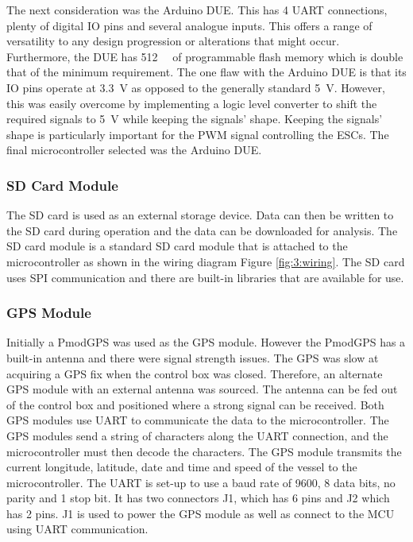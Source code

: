 		The next consideration was the Arduino DUE. This has 4 UART connections, plenty of digital IO pins and several analogue inputs. This offers a range of versatility to any design progression or alterations that might occur. Furthermore, the DUE has \SI{512}{\kilo\byte} of programmable flash memory which is double that of the minimum requirement. The one flaw with the Arduino DUE is that its IO pins operate at \SI{3.3}{\volt} as opposed to the generally standard \SI{5}{\volt}. However, this was easily overcome by implementing a logic level converter to shift the required signals to \SI{5}{\volt} while keeping the signals' shape. Keeping the signals' shape is particularly important for the PWM signal controlling the ESCs. The final microcontroller selected was the Arduino DUE.
		\subsubsection{SD Card Module}
		The SD card is used as an external storage device. Data can then be written to the SD card during operation and the data can be downloaded for analysis. The SD card module is a standard SD card module that is attached to the microcontroller as shown in the wiring diagram Figure \ref{fig:3:wiring}. The SD card uses SPI communication and there are built-in libraries that are available for use.
		\subsubsection{GPS Module}
		Initially a PmodGPS was used as the GPS module. However the PmodGPS has a built-in antenna and there were signal strength issues. The GPS was slow at acquiring a GPS fix when the control box was closed. Therefore, an alternate GPS module with an external antenna was sourced. The antenna can be fed out of the control box and positioned where a strong signal can be received. Both GPS modules use UART to communicate the data to the microcontroller. The GPS modules send a string of characters along the UART connection, and the microcontroller must then decode the characters. The GPS module transmits the current longitude, latitude, date and time and speed of the vessel to the microcontroller. The UART is set-up to use a baud rate of 9600, 8 data bits, no parity and 1 stop bit. It has two connectors J1, which has 6 pins and J2 which has 2 pins. J1 is used to power the GPS module as well as connect to the MCU using UART communication.
